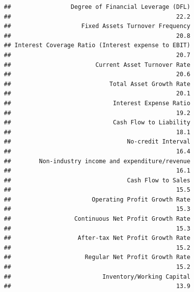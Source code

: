\documentclass[
]{book}
\begin{document}
\begin{verbatim}
##                 Degree of Financial Leverage (DFL) 
##                                               22.2 
##                    Fixed Assets Turnover Frequency 
##                                               20.8 
## Interest Coverage Ratio (Interest expense to EBIT) 
##                                               20.7 
##                        Current Asset Turnover Rate 
##                                               20.6 
##                            Total Asset Growth Rate 
##                                               20.1 
##                             Interest Expense Ratio 
##                                               19.2 
##                             Cash Flow to Liability 
##                                               18.1 
##                                 No-credit Interval 
##                                               16.4 
##        Non-industry income and expenditure/revenue 
##                                               16.1 
##                                 Cash Flow to Sales 
##                                               15.5 
##                       Operating Profit Growth Rate 
##                                               15.3 
##                  Continuous Net Profit Growth Rate 
##                                               15.3 
##                   After-tax Net Profit Growth Rate 
##                                               15.2 
##                     Regular Net Profit Growth Rate 
##                                               15.2 
##                          Inventory/Working Capital 
##                                               13.9
\end{verbatim}
\end{document}
